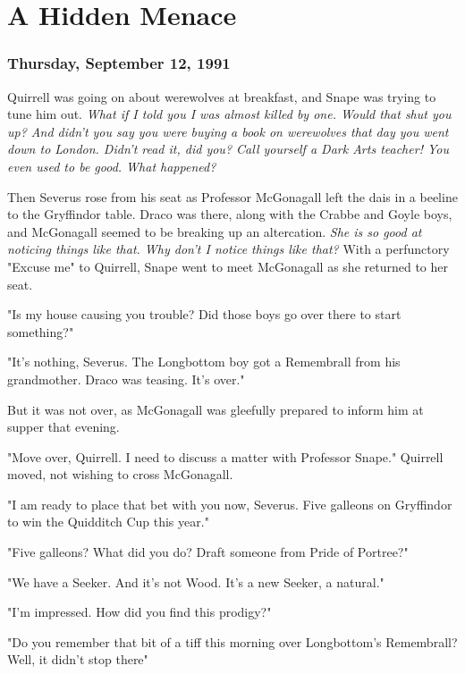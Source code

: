 
\chapter{A Hidden Menace}

\subsection{Thursday, September 12, 1991}

Quirrell was going on about werewolves at breakfast, and Snape was trying to tune him out. \emph{What if I told you I was almost killed by one. Would that shut you up? And didn't you say you were buying a book on werewolves that day you went down to London. Didn't read it, did you? Call yourself a Dark Arts teacher! You even used to be good. What happened?}

Then Severus rose from his seat as Professor McGonagall left the dais in a beeline to the Gryffindor table. Draco was there, along with the Crabbe and Goyle boys, and McGonagall seemed to be breaking up an altercation. \emph{She is so good at noticing things like that. Why don't I notice things like that?} With a perfunctory "Excuse me" to Quirrell, Snape went to meet McGonagall as she returned to her seat.

"Is my house causing you trouble? Did those boys go over there to start something?"

"It's nothing, Severus. The Longbottom boy got a Remembrall from his grandmother. Draco was teasing. It's over."

But it was not over, as McGonagall was gleefully prepared to inform him at supper that evening.

"Move over, Quirrell. I need to discuss a matter with Professor Snape." Quirrell moved, not wishing to cross McGonagall.

"I am ready to place that bet with you now, Severus. Five galleons on Gryffindor to win the Quidditch Cup this year."

"Five galleons? What did you do? Draft someone from Pride of Portree?"

"We have a Seeker. And it's not Wood. It's a new Seeker, a natural."

"I'm impressed. How did you find this prodigy?"

"Do you remember that bit of a tiff this morning over Longbottom's Remembrall? Well, it didn't stop there{\el}"

